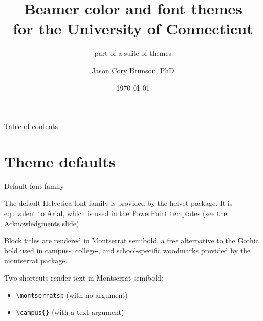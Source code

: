 \documentclass{beamer}
\title[Beamer colors and fonts for UConn]{Beamer color and font themes\\ for the University of Connecticut}
\subtitle{part of a suite of themes}
\author[Cory Brunson]{Jason Cory Brunson, PhD}
\institute[UConn Health]{Center for Quantitative Medicine\\ University of Connecticut School of Medicine}
\date{\today}
\begin{document}
\begin{frame}
\titlepage
\end{frame}


\begin{frame}{Table of contents}
\tableofcontents
\end{frame}


\section{Theme defaults}


\begin{frame}[fragile]{Default font family}

The default Helvetica font family is provided by the {\ttfamily helvet} package.
It is equivalent to Arial, which is used in the PowerPoint templates (see the \hyperlink{slide:acknowledgments}{Acknowledgments slide}).

Block titles are rendered in \href{http://mirrors.ibiblio.org/CTAN/fonts/montserrat/doc/montserrat-doc.pdf}{{\montserratsb Montserrat semibold}}, a free alternative to \href{https://brand.uconn.edu/standards/fonts/}{the Gothic bold} used in campus-, college-, and school-specific woodmarks provided by the {\ttfamily montserrat} package.

Two shortcuts render text in Montserrat semibold:
\begin{itemize}
\item \verb|\montserratsb| (with no argument)
\item \verb|\campus{}| (with a text argument)
\end{itemize}

\end{frame}
\end{document}
